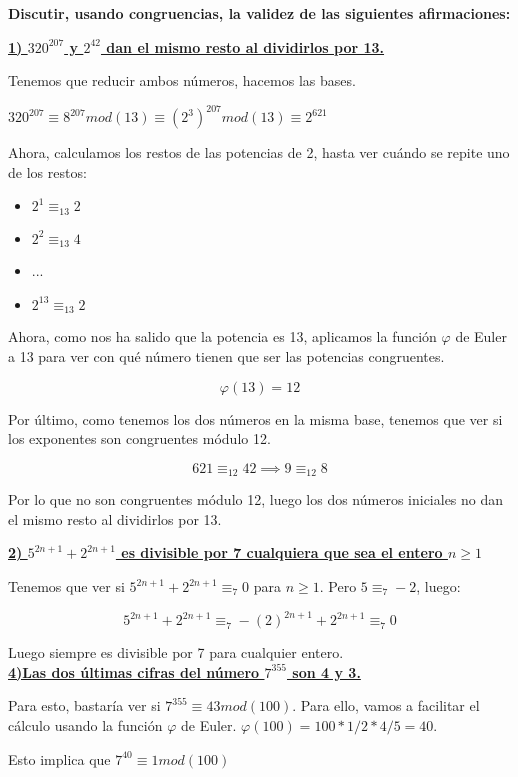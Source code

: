 \documentclass[11pt, a4paper, titlepage]{article}
\begin{document}
\textbf{ Discutir, usando congruencias, la validez de las siguientes afirmaciones:}

\underline{\textbf{1) $320^{207}$ y $2^{42}$ dan el mismo resto al dividirlos por 13.}}

Tenemos que reducir ambos números, hacemos las bases.

$320^{207}\equiv 8^{207}mod(13) \equiv (2^3)^{207} mod(13) \equiv 2^{621}$

Ahora, calculamos los restos de las potencias de 2, hasta ver cuándo se repite uno de los restos:

\begin{itemize}
	\item $2^1 \equiv_{13} 2$
	\item $2^2 \equiv_{13} 4$
	\item ...
	\item $2^{13} \equiv_{13} 2$
\end{itemize}

Ahora, como nos ha salido que la potencia es 13, aplicamos la función $\varphi$ de Euler a 13 para ver con qué número tienen que ser las potencias congruentes.

\[
\varphi(13) = 12
\]

Por último, como tenemos los dos números en la misma base, tenemos que ver si los exponentes son congruentes módulo 12.

\[
621 \equiv_{12} 42 \implies 9 \equiv_{12} 8
\]

Por lo que no son congruentes módulo 12, luego los dos números iniciales no dan el mismo resto al dividirlos por 13.

\textbf{\underline{2) $5^{2n+1} + 2^{2n+1}$ es divisible por 7 cualquiera que sea el entero $n \geq 1$}}

Tenemos que ver si $5^{2n+1} + 2^{2n+1} \equiv_7 0$ para $n\geq 1$. Pero $5\equiv_7 -2$, luego:

\[
5^{2n+1} + 2^{2n+1} \equiv_7 -(2)^{2n+1} + 2^{2n+1} \equiv_7 0
\]

Luego siempre es divisible por 7 para cualquier entero.\\


\underline{\textbf{4)Las dos últimas cifras del número $7^{355}$ son 4 y 3.}}

Para esto, bastaría ver si $7^{355} \equiv 43 mod(100)$. Para ello, vamos a facilitar el cálculo usando la función $\varphi$ de Euler. $\varphi(100) = 100*1/2 * 4/5 = 40$.

Esto implica que $ 7^{40} \equiv 1 mod(100)$
\end{document}
